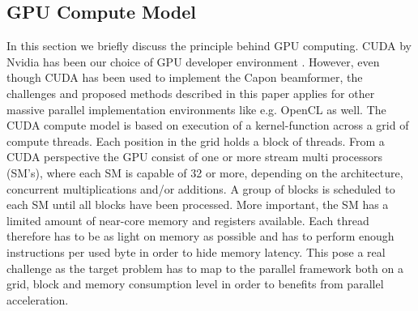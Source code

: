 \documentclass[journal]{IEEEtran}
\begin{document}
\subsection{GPU Compute Model}
In this section we briefly discuss the principle behind GPU computing. CUDA by Nvidia has been our choice of GPU developer environment \cite{Nvidia2011}. However, even though CUDA has been used to implement the Capon beamformer, the challenges and proposed methods described in this paper applies for other massive parallel implementation environments like e.g. OpenCL as well. The CUDA compute model is based on execution of a kernel-function across a grid of compute threads. Each position in the grid holds a block of threads.
From a CUDA perspective the GPU consist of one or more stream multi processors (SM's), where each SM is capable of 32 or more, depending on the architecture, concurrent multiplications and/or additions. A group of blocks is scheduled to each SM until all blocks have been processed. More important, the SM has a limited amount of near-core memory and registers available. Each thread therefore has to be as light on memory as possible and has to perform enough instructions per used byte in order to hide memory latency. This pose a real challenge as the target problem has to map to the parallel framework both on a grid, block and memory consumption level in order to benefits from parallel acceleration.    


\end{document}
